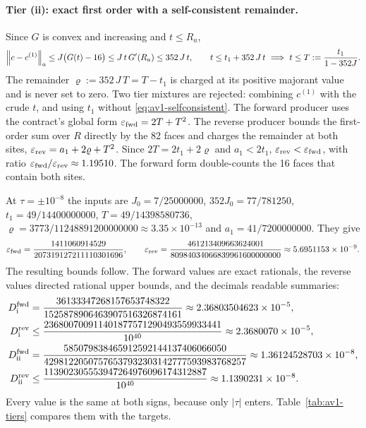 \paragraph{Tier (ii): exact first order with a self-consistent remainder.}
Since $G$ is convex and increasing and $t\le R_a$,
\begin{equation}
 \left\lVert c-c^{(1)}\right\rVert_a\le J\bigl(G(t)-16\bigr)\le J\,t\,G'(R_a)\le352\,J\,t,
 \qquad
 t\le t_1+352\,J\,t\ \Longrightarrow\ t\le T:=\frac{t_1}{1-352J}.
 \label{eq:av1-selfconsistent}
\end{equation}
The remainder $\varrho:=352\,J\,T=T-t_1$ is charged at its positive majorant
value and is never set to zero. Two tier mixtures are rejected: combining
$c^{(1)}$ with the crude $t$, and using $t_1$ without
\eqref{eq:av1-selfconsistent}. The forward producer uses the contract's global
form $\varepsilon_{\rm fwd}=2T+T^2$. The reverse producer bounds the
first-order sum over $R$ directly by the 82 faces and charges the remainder at
both sites, $\varepsilon_{\rm rev}=a_1+2\varrho+T^2$. Since $2T=2t_1+2\varrho$
and $a_1<2t_1$, $\varepsilon_{\rm rev}<\varepsilon_{\rm fwd}$, with ratio
$\varepsilon_{\rm fwd}/\varepsilon_{\rm rev}\approx1.19510$. The forward form
double-counts the 16 faces that contain both sites.

At $\tau=\pm10^{-8}$ the inputs are $J_0=7/25000000$, $352J_0=77/781250$,
$t_1=49/14400000000$, $T=49/14398580736$,
$\varrho=3773/11248891200000000\approx3.35\times10^{-13}$ and
$a_1=41/7200000000$. They give
\begin{equation}
 \varepsilon_{\rm fwd}=\frac{1411060914529}{207319127211110301696},\qquad
 \varepsilon_{\rm rev}=\frac{461213409663624001}{80984034066839961600000000}
 \approx5.6951153\times10^{-9}.
 \label{eq:av1-epsvalues}
\end{equation}
The resulting bounds follow. The forward values are exact rationals, the
reverse values directed rational upper bounds, and the decimals readable
summaries:
\begin{align}
 D_{\rm i}^{\rm fwd}&=\frac{36133347268157653748322}{1525878906463907516326874161}
 \approx2.36803504623\times10^{-5},\label{eq:av1-Di}\\
 D_{\rm i}^{\rm rev}&\le\frac{236800700911401877571290493559933441}{10^{40}}
 \approx2.3680070\times10^{-5},\\
 D_{\rm ii}^{\rm fwd}&=\frac{585079838465912592144137406066050}{42981220507576537932303142777593983768257}
 \approx1.36124528703\times10^{-8},\label{eq:av1-Dii}\\
 D_{\rm ii}^{\rm rev}&\le\frac{113902305553947264976096174312887}{10^{40}}
 \approx1.1390231\times10^{-8}.\label{eq:av1-Diirev}
\end{align}
Every value is the same at both signs, because only $|\tau|$ enters.
Table~\ref{tab:av1-tiers} compares them with the targets.

